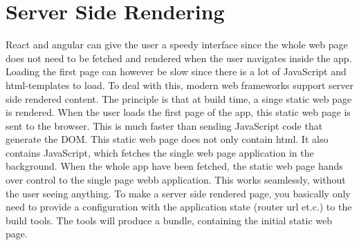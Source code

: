 \chapter{Server Side Rendering} \label{chapter:server:side:rendering}
React and angular can give the user a speedy interface since the whole web page does not need to be fetched and rendered when the user navigates inside the app. Loading the first page can however be slow since there is a lot of JavaScript and html-templates to load. To deal with this, modern web frameworks support server side rendered content. The principle is that at build time, a singe static web page is rendered. When the user loads the first page of the app, this static web page is sent to the browser. This is much faster than sending JavaScript code that generate the DOM. This static web page does not only contain html. It also contains JavaScript, which fetches the single web page application in the background. When the whole app have been fetched, the static web page hands over control to the single page webb application. This works seamlessly, without the user seeing anything.
 To make a server side rendered page, you basically only need to provide a configuration with the application state (router url et.c.) to the build tools. The tools will produce a bundle, containing the initial static web page.

